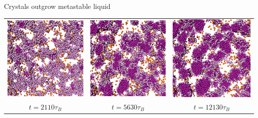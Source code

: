\documentclass[xcolor=table]{beamer}
\begin{document}
\begin{frame}{Crystals outgrow metastable liquid}
	\let\imw\relax
	\newlength\imw
	\setlength{\imw}{0.29\linewidth}
	\begin{scriptsize}
	\begin{tabular}{ccc}
	\includegraphics[width=\imw]{presentation/sliceILM_t120.png}&
	\includegraphics[width=\imw]{presentation/sliceILM_t390.png}&
	\includegraphics[width=\imw]{presentation/sliceILM_t890.png}\\
	$t=2110\tau_B$ & $t=5630\tau_B$ & $t=12130\tau_B$\\
	\end{tabular}
	\end{scriptsize}
\end{frame}
\end{document}

